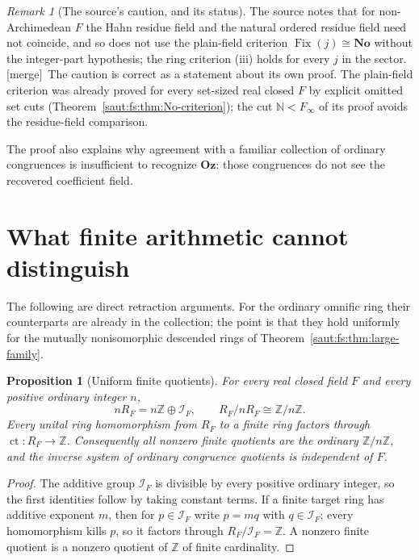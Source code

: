 \documentclass[11pt]{article}
\newtheorem{proposition}[theorem]{Proposition}
\theoremstyle{definition}
\theoremstyle{remark}
\newtheorem{remark}[theorem]{Remark}
\newcommand{\No}{\mathbf{No}}
\newcommand{\N}{\mathbb N}
\newcommand{\Z}{\mathbb Z}
\newcommand{\Fix}{\operatorname{Fix}}
\newcommand{\Oz}{\mathbf{Oz}}
\newcommand{\ct}{\operatorname{ct}}
\newcommand{\Ineg}{\mathcal I}
\newcommand{\mergetag}{\textup{[merge]}}
\numberwithin{equation}{section}
\begin{document}
\begin{remark}[The source's caution, and its status]\label{saut:gr:rem:plain}
The source notes that for non-Archimedean $F$ the Hahn residue field and the natural
ordered residue field need not coincide, and so does not use the plain-field criterion
$\Fix(j)\cong\No$ without the integer-part hypothesis; the ring criterion (iii) holds
for every $j$ in the sector. \mergetag\ The caution is correct as a statement about its
own proof. The plain-field criterion was already proved for every set-sized real
closed $F$ by explicit omitted set cuts (Theorem~\ref{saut:fs:thm:No-criterion}); the
cut $\N<F_\infty$ of its proof avoids the residue-field comparison.
\end{remark}

The proof also explains why agreement with a familiar collection of ordinary
congruences is insufficient to recognize $\Oz$: those congruences do not see the
recovered coefficient field.

\section{What finite arithmetic cannot distinguish}\label{saut:gr:sec:finite}

The following are direct retraction arguments. For the ordinary omnific ring their
counterparts are already in the collection; the point is that they hold uniformly for
the mutually nonisomorphic descended rings of Theorem~\ref{saut:fs:thm:large-family}.

\begin{proposition}[Uniform finite quotients]\label{saut:gr:prop:finite}
For every real closed field $F$ and every positive ordinary integer $n$,
\[
 nR_F=n\Z\oplus\Ineg_F,\qquad R_F/nR_F\cong\Z/n\Z .
\]
Every unital ring homomorphism from $R_F$ to a finite ring factors through
$\ct:R_F\to\Z$. Consequently all nonzero finite quotients are the ordinary $\Z/n\Z$, and
the inverse system of ordinary congruence quotients is independent of $F$.
\end{proposition}
\begin{proof}
The additive group $\Ineg_F$ is divisible by every positive ordinary integer, so the
first identities follow by taking constant terms. If a finite target ring has additive
exponent $m$, then for $p\in\Ineg_F$ write $p=mq$ with $q\in\Ineg_F$; every homomorphism
kills $p$, so it factors through $R_F/\Ineg_F=\Z$. A nonzero finite quotient is a
nonzero quotient of $\Z$ of finite cardinality.
\end{proof}
\end{document}
